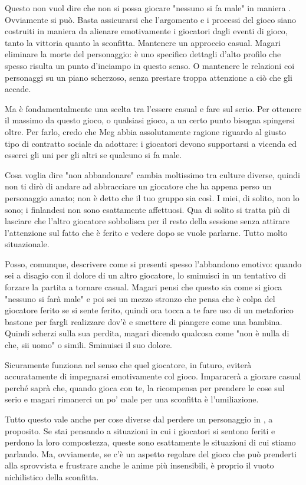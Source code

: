 Questo non vuol dire che non si possa giocare "nessuno si fa male" in maniera . Ovviamente si può. Basta assicurarsi che l'argomento e i processi del gioco siano costruiti in maniera da alienare emotivamente i giocatori dagli eventi di gioco, tanto la vittoria quanto la sconfitta. Mantenere un approccio casual. Magari eliminare la morte del personaggio: è uno specifico dettagli d'alto profilo che spesso risulta un punto d'inciampo in questo senso. O mantenere le relazioni coi personaggi su un piano scherzoso, senza prestare troppa attenzione a ciò che gli accade.

Ma è fondamentalmente una scelta tra l'essere casual e fare sul serio. Per ottenere il massimo da questo gioco, o qualsiasi gioco, a un certo punto bisogna spingersi oltre. Per farlo, credo che Meg abbia assolutamente ragione riguardo al giusto tipo di contratto sociale da adottare: i giocatori devono supportarsi a vicenda ed esserci gli uni per gli altri se qualcuno si fa male.

Cosa voglia dire "non abbandonare" cambia moltissimo tra culture diverse, quindi non ti dirò di andare ad abbracciare un giocatore che ha appena perso un personaggio amato; non è detto che il tuo gruppo sia così. I miei, di solito, non lo sono; i finlandesi non sono esattamente affettuosi. Qua di solito si tratta più di lasciare che l'altro giocatore sobbolisca per il resto della sessione senza attirare l'attenzione sul fatto che è ferito e vedere dopo se vuole parlarne. Tutto molto situazionale.

Posso, comunque, descrivere come si presenti spesso l'abbandono emotivo: quando sei a disagio con il dolore di un altro giocatore, lo sminuisci in un tentativo di forzare la partita a tornare casual. Magari pensi che questo sia come si gioca "nessuno si farà male" e poi sei un mezzo stronzo che pensa che è colpa del giocatore ferito se si sente ferito, quindi ora tocca a te fare uso di un metaforico bastone per fargli realizzare dov'è e smettere di piangere come una bambina. Quindi scherzi sulla sua perdita, magari dicendo qualcosa come "non è nulla di che, sii uomo" o simili. Sminuisci il suo dolore.

Sicuramente funziona nel senso che quel giocatore, in futuro, eviterà accuratamente di impegnarsi emotivamente col gioco. Impararerà a giocare casual perché saprà che, quando gioca con te, la ricompensa per prendere le cose sul serio e magari rimanerci un po' male per una sconfitta è l'umiliazione.

Tutto questo vale anche per cose diverse dal perdere un personaggio in \dnd{}, a proposito. Se stai pensando a situazioni in cui i giocatori si sentono feriti e perdono la loro compostezza, queste sono esattamente le situazioni di cui stiamo parlando. Ma, ovviamente, se c'è un aspetto regolare del gioco che può prenderti alla sprovvista e frustrare anche le anime più insensibili, è proprio il vuoto nichilistico della sconfitta.

